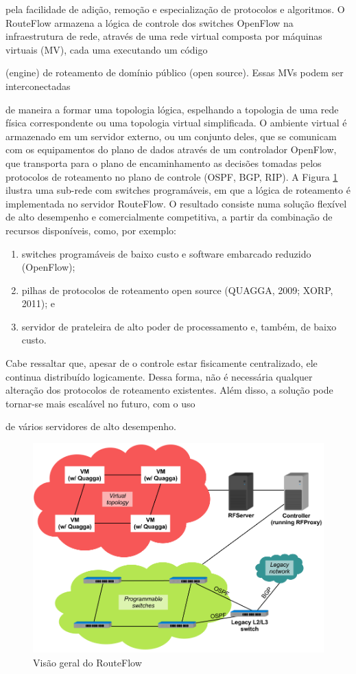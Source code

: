 pela
facilidade de adição, remoção e especialização 
de protocolos e algoritmos. O RouteFlow
armazena a lógica de controle dos switches 
OpenFlow na infraestrutura de rede, através 
de
uma rede virtual composta por máquinas 
virtuais (MV), cada uma executando um código 

(engine)
de roteamento de domínio público (open 
source). Essas MVs podem ser interconectadas 

de
maneira a formar uma topologia lógica, 
espelhando a topologia de uma rede física
correspondente ou uma topologia virtual 
simplificada. O ambiente virtual é 
armazenado
em um servidor externo, ou um conjunto deles, 
que se comunicam com os equipamentos do
plano de dados através de um controlador 
OpenFlow, que transporta para o plano de
encaminhamento as decisões tomadas pelos 
protocolos de roteamento no plano de 
controle
(OSPF, BGP, RIP). A Figura 
\ref{fig:visaoGeralRouteFlow} ilustra uma 
sub-rede com switches programáveis, 
em que a
lógica de roteamento é implementada no 
servidor RouteFlow. 
O resultado consiste numa solução flexível de 
alto desempenho e comercialmente 
competitiva,
a partir da combinação de recursos 
disponíveis, como, por exemplo:

\begin{enumerate}[{a)}]
\item switches programáveis de baixo custo e 
software embarcado reduzido (OpenFlow); 
\item pilhas de protocolos de roteamento open 
source (QUAGGA, 2009; XORP, 2011); e 
\item servidor de prateleira de alto poder de 
processamento e, também, de baixo custo.
\end{enumerate}

Cabe ressaltar que, apesar de o controle estar 
fisicamente centralizado, ele continua 
distribuído
logicamente. Dessa forma, não é necessária 
qualquer alteração dos protocolos de 
roteamento
existentes. Além disso, a solução pode 
tornar-se mais escalável no futuro, com o uso 

de vários
servidores de alto desempenho.

\begin{figure}[hb]
\centering
\includegraphics[width=135mm]{visaoGeralRouteFlow.png}
\caption{Visão geral do RouteFlow}
\label{fig:visaoGeralRouteFlow}
\end{figure}

